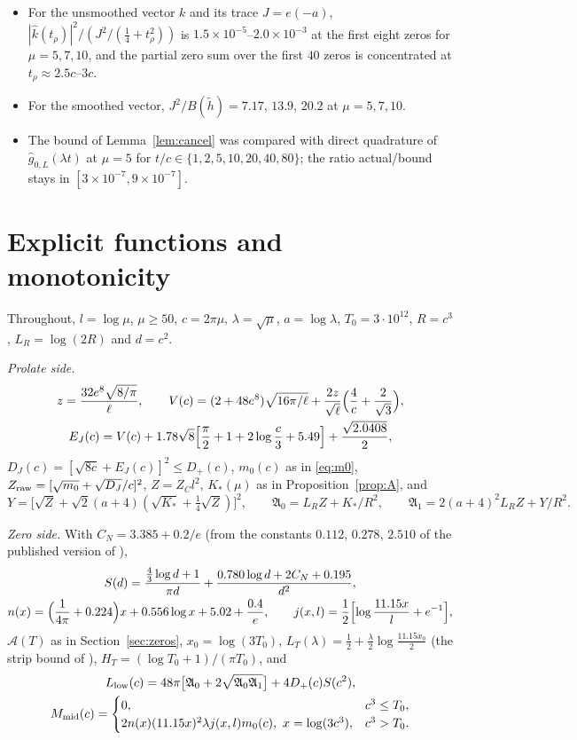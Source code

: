 \documentclass[11pt]{amsart}
\theoremstyle{remark}
\numberwithin{equation}{section}
\begin{document}
\begin{itemize}
\item For the unsmoothed vector $k$ and its trace $J=e(-a)$, $|\hat k(t_\rho)|^2/(J^2/(\frac14+t_\rho^2))$ is $1.5\times10^{-5}$--$2.0\times10^{-3}$ at the first eight zeros for $\mu=5,7,10$, and the partial zero sum over the first $40$ zeros is concentrated at $t_\rho\approx2.5c$--$3c$.
\item For the smoothed vector, $J^2/B(\tilde h)=7.17$, $13.9$, $20.2$ at $\mu=5,7,10$.
\item The bound of Lemma~\ref{lem:cancel} was compared with direct quadrature of $\hat g_{0,L}(\lambda t)$ at $\mu=5$ for $t/c\in\{1,2,5,10,20,40,80\}$; the ratio actual/bound stays in $[3\times10^{-7},9\times10^{-7}]$.
\end{itemize}

\appendix
\section{Explicit functions and monotonicity}\label{app:functions}

Throughout, $l=\log\mu$, $\mu\ge50$, $c=2\pi\mu$, $\lambda=\sqrt\mu$, $a=\log\lambda$, $T_0=3\cdot10^{12}$, $R=c^3$, $L_R=\log(2R)$ and $d=c^2$.

\emph{Prolate side.}
\begin{gather*}
z=\frac{32e^8\sqrt{8/\pi}}{\ell},\qquad V(c)=(2+48e^8)\sqrt{16\pi/\ell}+\frac{2z}{\sqrt\ell}\Bigl(\frac4c+\frac2{\sqrt3}\Bigr),\\
E_J(c)=V(c)+1.78\sqrt8\Bigl[\frac\pi2+1+2\log\frac c3+5.49\Bigr]+\frac{\sqrt{2.0408}}2,
\end{gather*}
$D_J(c)=[\sqrt{8c}+E_J(c)]^2\le D_+(c)$, $m_0(c)$ as in \eqref{eq:m0}, $Z_{\rm raw}=[\sqrt{m_0}+\sqrt{D_J}/c]^2$, $Z=Z_Cl^2$, $K_*(\mu)$ as in Proposition~\ref{prop:A}, and
\[
Y=\bigl[\sqrt Z+\sqrt2(a+4)(\sqrt{K_*}+\tfrac14\sqrt Z)\bigr]^2,\qquad \mathfrak A_0=L_RZ+K_*/R^2,\qquad \mathfrak A_1=2(a+4)^2L_RZ+Y/R^2.
\]

\emph{Zero side.} With $C_N=3.385+0.2/e$ (from the constants $0.112$, $0.278$, $2.510$ of the published version of \cite{Trudgian14}),
\begin{gather*}
S(d)=\frac{\frac43\log d+1}{\pi d}+\frac{0.780\log d+2C_N+0.195}{d^2},\\
n(x)=\Bigl(\frac1{4\pi}+0.224\Bigr)x+0.556\log x+5.02+\frac{0.4}e,\qquad
j(x,l)=\frac12\Bigl[\log\frac{11.15x}l+e^{-1}\Bigr],
\end{gather*}
$\mathcal A(T)$ as in Section~\ref{sec:zeros}, $x_0=\log(3T_0)$, $L_T(\lambda)=\frac12+\frac\lambda2\log\frac{11.15x_0}2$ (the strip bound of \cite[proof of Lemma~5.1]{MoriWeilII}), $H_T=(\log T_0+1)/(\pi T_0)$, and
\begin{gather*}
L_{\rm low}(c)=48\pi\bigl[\mathfrak A_0+2\sqrt{\mathfrak A_0\mathfrak A_1}\bigr]+4D_+(c)S(c^2),\\
M_{\rm mid}(c)=\begin{cases}0,&c^3\le T_0,\\ 2n(x)(11.15x)^2\lambda j(x,l)m_0(c),\ x=\log(3c^3),&c^3>T_0.\end{cases}
\end{gather*}
\end{document}
